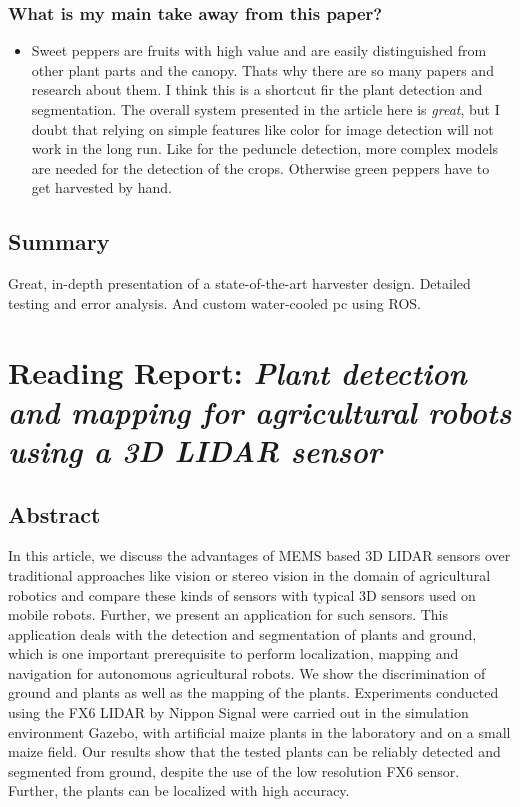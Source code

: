     \subsubsection*{What is my main take away from this paper?}
    \begin{itemize}
        \item Sweet peppers are fruits with high value and are easily distinguished from other plant parts and the canopy. Thats why there are so many papers and research about them. I think this is a shortcut fir the plant detection and segmentation. The overall system presented in the article here is \emph{great}, but I doubt that relying on simple features like color for image detection will not work in the long run. Like for the peduncle detection, more complex models are needed for the detection of the crops. Otherwise green peppers have to get harvested by hand.
    \end{itemize}
    
    \subsection*{Summary}
    Great, in-depth presentation of a state-of-the-art harvester design. Detailed testing and error analysis. And custom water-cooled pc using ROS.

    
    
    
    \newpage
    
    \section{Reading Report: \emph{Plant detection and mapping for agricultural robots using a 3D LIDAR sensor}}
    \label{sec:Weiss2011}
    \cite{Weiss2011}
    
    \subsection*{Abstract}
    
    In this article, we discuss the advantages of MEMS based 3D LIDAR sensors over traditional approaches
    like vision or stereo vision in the domain of agricultural robotics and compare these kinds of sensors
    with typical 3D sensors used on mobile robots. Further, we present an application for such sensors. This
    application deals with the detection and segmentation of plants and ground, which is one important
    prerequisite to perform localization, mapping and navigation for autonomous agricultural robots. We
    show the discrimination of ground and plants as well as the mapping of the plants. Experiments conducted
    using the FX6 LIDAR by Nippon Signal were carried out in the simulation environment Gazebo, with
    artificial maize plants in the laboratory and on a small maize field. Our results show that the tested plants
    can be reliably detected and segmented from ground, despite the use of the low resolution FX6 sensor.
    Further, the plants can be localized with high accuracy.
    
